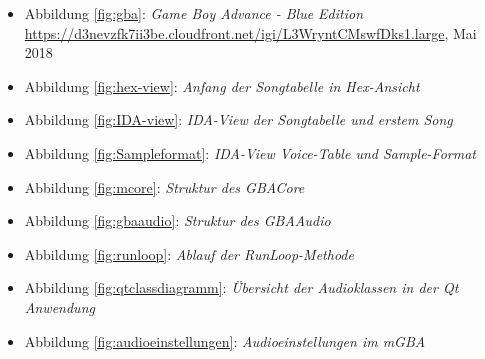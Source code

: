\documentclass[11pt,a4paper]{scrartcl}
\begin{document}
\begin{itemize}
    \item Abbildung \ref{fig:gba}: \textit{Game Boy Advance - Blue Edition}\newline
    \url{https://d3nevzfk7ii3be.cloudfront.net/igi/L3WryntCMswfDks1.large}, Mai 2018
    
    \item Abbildung \ref{fig:hex-view}: \textit{Anfang der Songtabelle in Hex-Ansicht}
    
    \item Abbildung \ref{fig:IDA-view}: \textit{IDA-View der Songtabelle und erstem Song}
    
    \item Abbildung \ref{fig:Sampleformat}: \textit{IDA-View Voice-Table und Sample-Format}
    
    \item Abbildung \ref{fig:mcore}: \textit{Struktur des GBACore}
    
    \item Abbildung \ref{fig:gbaaudio}: \textit{Struktur des GBAAudio}
    
    \item Abbildung \ref{fig:runloop}: \textit{Ablauf der RunLoop-Methode}
    
    \item Abbildung \ref{fig:qtclassdiagramm}: \textit{\"Ubersicht der Audioklassen in der Qt Anwendung}
    
    \item Abbildung \ref{fig:audioeinstellungen}: \textit{Audioeinstellungen im mGBA}
\end{itemize}
\end{document}
